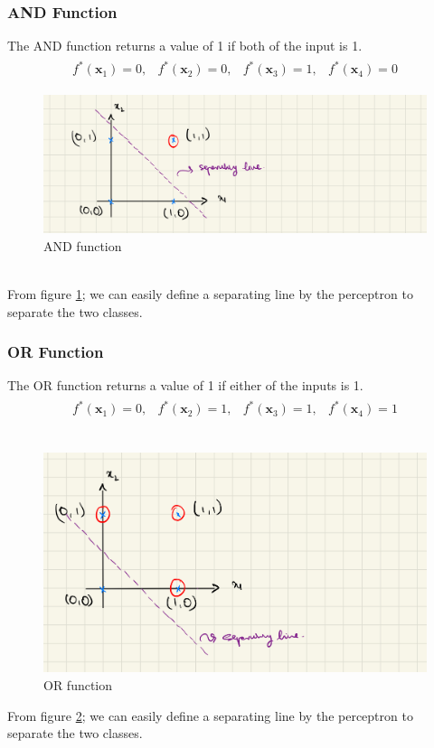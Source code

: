 \subsubsection*{AND Function}
The AND function returns a value of 1 if both of the input is 1. 
\begin{align}
  \begin{matrix}
    f^{*}(\textbf{x}_1)=0,&   f^{*}(\textbf{x}_2)=0,&  f^{*}(\textbf{x}_3)=1,&   f^{*}(\textbf{x}_4)=0    
  \end{matrix}
\end{align}
\begin{figure}[h]
  \centering
  \includegraphics[scale=0.15]{CHAPTER_2/c2_fig_AND.jpeg}
  \caption{AND function}
  \label{AND_function}
\end{figure} \\
\noindent From figure \ref{AND_function}; we can easily define a separating line by the perceptron to separate the two classes.
\subsubsection*{OR Function}
The OR function returns a value of 1 if either of the inputs is 1.
\begin{align}
  \begin{matrix}
    f^{*}(\textbf{x}_1)=0,&   f^{*}(\textbf{x}_2)=1,& f^{*}(\textbf{x}_3)=1,&   f^{*}(\textbf{x}_4)=1    
  \end{matrix}
\end{align} \\
\begin{figure}[ht]
  \centering
  \includegraphics[scale=0.15]{CHAPTER_2/c2_fig_OR.jpeg}
  \caption{OR function}
  \label{OR_function}
\end{figure}
\vspace{100mm}
\noindent From figure \ref{OR_function}; we can easily define a separating line by the perceptron to separate the two classes.
